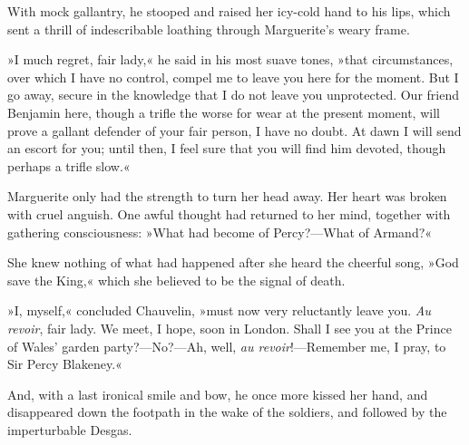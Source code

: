 With mock gallantry, he stooped and raised her icy-cold hand to his lips, which sent a thrill of indescribable loathing through Marguerite's weary frame.

»I much regret, fair lady,« he said in his most suave tones, »that circumstances, over which I have no control, compel me to leave you here for the moment. But I go away, secure in the knowledge that I do not leave you unprotected. Our friend Benjamin here, though a trifle the worse for wear at the present moment, will prove a gallant defender of your fair person, I have no doubt. At dawn I will send an escort for you; until then, I feel sure that you will find him devoted, though perhaps a trifle slow.«

Marguerite only had the strength to turn her head away. Her heart was broken with cruel anguish. One awful thought had returned to her mind, together with gathering consciousness: »What had become of Percy?\allowbreak---\allowbreak What of Armand?«

She knew nothing of what had happened after she heard the cheerful song, »God save the King,« which she believed to be the signal of death.

»I, myself,« concluded Chauvelin, »must now very reluctantly leave you. \textit{Au revoir}, fair lady. We meet, I hope, soon in London. Shall I see you at the Prince of Wales' garden party?\allowbreak---\allowbreak No?\allowbreak---\allowbreak Ah, well, \textit{au revoir}!\allowbreak---\allowbreak Remember me, I pray, to Sir Percy Blakeney.«

And, with a last ironical smile and bow, he once more kissed her hand, and disappeared down the footpath in the wake of the soldiers, and followed by the imperturbable Desgas.